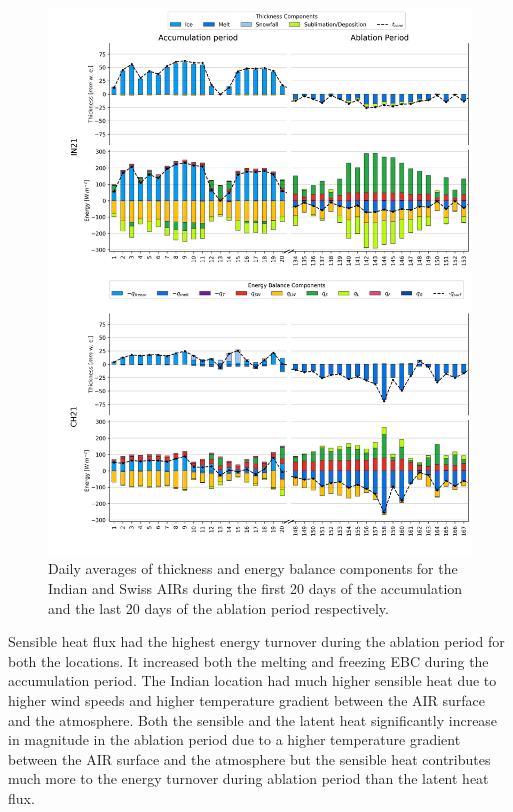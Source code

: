 \documentclass[utf8]{frontiersSCNS}
\begin{document}
\begin{figure}
	\begin{center}
		\includegraphics[width=\linewidth]{Figures/mass_energy_bal.jpg} \end{center}
	\caption{Daily averages of thickness and energy balance components for the Indian and Swiss AIRs during the
		first 20 days of the accumulation and the last 20 days of the ablation period respectively.  } \label{fig:MEB}
\end{figure}


Sensible heat flux had the highest energy turnover during the ablation period for both the locations. It increased both the melting and
freezing EBC during the accumulation period. The Indian location had much higher sensible heat due to higher wind
speeds and higher temperature gradient between the AIR surface and the atmosphere. Both the sensible and the
latent heat significantly increase in magnitude in the ablation period due to a higher temperature gradient
between the AIR surface and the atmosphere but the sensible heat contributes much more to the energy turnover
during ablation period than the latent heat flux.
\end{document}

